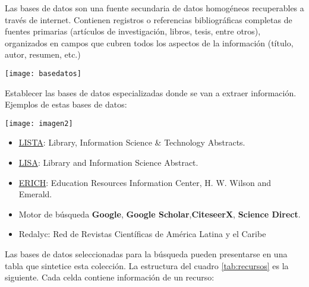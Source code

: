  Las bases de datos son una fuente secundaria de datos homogéneos recuperables a través de internet. Contienen registros o referencias bibliográficas completas de fuentes primarias (artículos de investigación, libros, tesis, entre otros), organizados en campos que cubren todos los aspectos de la información (título, autor, resumen, etc.)
 
  \begin{marginfigure}[-2cm]%
 	\texttt{[image: basedatos]}
 \end{marginfigure}
 
 Establecer las bases de datos especializadas donde se van a extraer información. Ejemplos de estas bases de datos:
 
 \begin{marginfigure}[2cm]%
 	\texttt{[image: imagen2]}
 \end{marginfigure}
 
 \begin{itemize}
 	\item  \href{https://www.ebsco.com/es/productos/bases-de-datos}{LISTA}: Library, Information Science \& Technology Abstracts. 
 	
 	\item \href{https://about.proquest.com/products-services/lisa-set-c.html}{LISA}: Library and Information Science Abstract.  
 	
 	\item  \href{https://libguides.du.edu/c.php?g=90436&p=582594}{ERICH}: Education Resources Information Center, H. W. Wilson and Emerald.   
 	 
 	\item   Motor de búsqueda \textbf{Google}, \textbf{Google Scholar},\textbf{CiteseerX}, \textbf{Science Direct}.
 	
  	\item  	Redalyc: Red de Revistas Científicas de América Latina y el Caribe
 \end{itemize}
   
 
 Las bases de datos seleccionadas para la búsqueda pueden presentarse en una tabla que sintetice esta colección. La estructura del cuadro \ref{tab:recursos} es la siguiente. Cada celda contiene información de un recurso:
 
